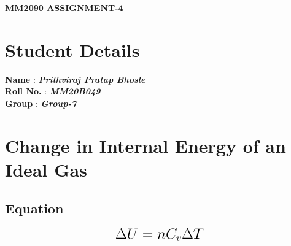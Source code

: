 \documentclass[a4paper, 12pt]{article}
\begin{document}
\begin{center}
	{\LARGE {\textbf {MM2090 ASSIGNMENT-4}}}
\end{center}

\section{Student Details}
\textbf {Name} : \textbf{\textit {Prithviraj Pratap Bhosle}}\\
\textbf {Roll No.} : \textbf{\textit {MM20B049}}\\
\textbf {Group} : \textbf{\textit {Group-7}}
\section{Change in Internal Energy of an Ideal Gas}
\subsection{Equation}
\begin{equation}
	{\LARGE{\textbf{$ \Delta U=n C_{v}  \Delta T $}}}
	\label{eq:1}
\end{equation}
\end{document}
